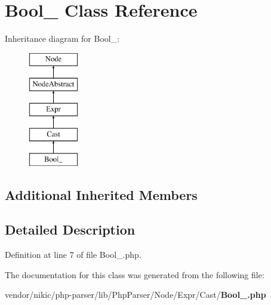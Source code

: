 \section{Bool\+\_\+ Class Reference}
\label{class_php_parser_1_1_node_1_1_expr_1_1_cast_1_1_bool__}
Inheritance diagram for Bool\+\_\+\+:\begin{figure}[H]
\begin{center}
\leavevmode
\includegraphics[height=5.000000cm]{class_php_parser_1_1_node_1_1_expr_1_1_cast_1_1_bool__}
\end{center}
\end{figure}
\subsection*{Additional Inherited Members}


\subsection{Detailed Description}


Definition at line 7 of file Bool\+\_\+.\+php.



The documentation for this class was generated from the following file\+:\begin{DoxyCompactItemize}
\item 
vendor/nikic/php-\/parser/lib/\+Php\+Parser/\+Node/\+Expr/\+Cast/{\bf Bool\+\_\+.\+php}\end{DoxyCompactItemize}
